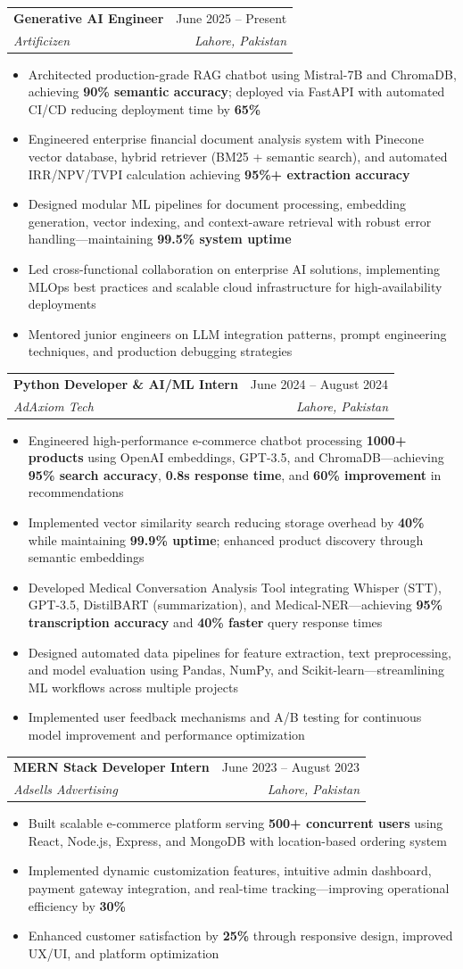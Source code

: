 \documentclass[letterpaper,10pt]{article}
\makeatletter
\newcommand{\resumeItem}[1]{\item\small{#1}}
\newcommand{\resumeSubheading}[4]{
  \vspace{-1pt}\item
    \begin{tabular*}{0.97\textwidth}[t]{l@{\extracolsep{\fill}}r}
      \textbf{#1} & #2 \\
      \textit{\small#3} & \textit{\small #4} \\
    \end{tabular*}\vspace{-5pt}
}
\newcommand{\resumeItemListStart}{\begin{itemize}[leftmargin=0.15in]}
\newcommand{\resumeItemListEnd}{\end{itemize}\vspace{-3pt}}
\makeatother
\begin{document}
\resumeSubheading
{Generative AI Engineer}{June 2025 -- Present}
{Artificizen}{Lahore, Pakistan}
\resumeItemListStart
\resumeItem{Architected production-grade RAG chatbot using Mistral-7B and ChromaDB, achieving \textbf{90\% semantic accuracy}; deployed via FastAPI with automated CI/CD reducing deployment time by \textbf{65\%}}
\resumeItem{Engineered enterprise financial document analysis system with Pinecone vector database, hybrid retriever (BM25 + semantic search), and automated IRR/NPV/TVPI calculation achieving \textbf{95\%+ extraction accuracy}}
\resumeItem{Designed modular ML pipelines for document processing, embedding generation, vector indexing, and context-aware retrieval with robust error handling—maintaining \textbf{99.5\% system uptime}}
\resumeItem{Led cross-functional collaboration on enterprise AI solutions, implementing MLOps best practices and scalable cloud infrastructure for high-availability deployments}
\resumeItem{Mentored junior engineers on LLM integration patterns, prompt engineering techniques, and production debugging strategies}
\resumeItemListEnd

\resumeSubheading
{Python Developer \& AI/ML Intern}{June 2024 -- August 2024}
{AdAxiom Tech}{Lahore, Pakistan}
\resumeItemListStart
\resumeItem{Engineered high-performance e-commerce chatbot processing \textbf{1000+ products} using OpenAI embeddings, GPT-3.5, and ChromaDB—achieving \textbf{95\% search accuracy}, \textbf{0.8s response time}, and \textbf{60\% improvement} in recommendations}
\resumeItem{Implemented vector similarity search reducing storage overhead by \textbf{40\%} while maintaining \textbf{99.9\% uptime}; enhanced product discovery through semantic embeddings}
\resumeItem{Developed Medical Conversation Analysis Tool integrating Whisper (STT), GPT-3.5, DistilBART (summarization), and Medical-NER—achieving \textbf{95\% transcription accuracy} and \textbf{40\% faster} query response times}
\resumeItem{Designed automated data pipelines for feature extraction, text preprocessing, and model evaluation using Pandas, NumPy, and Scikit-learn—streamlining ML workflows across multiple projects}
\resumeItem{Implemented user feedback mechanisms and A/B testing for continuous model improvement and performance optimization}
\resumeItemListEnd

\resumeSubheading
{MERN Stack Developer Intern}{June 2023 -- August 2023}
{Adsells Advertising}{Lahore, Pakistan}
\resumeItemListStart
\resumeItem{Built scalable e-commerce platform serving \textbf{500+ concurrent users} using React, Node.js, Express, and MongoDB with location-based ordering system}
\resumeItem{Implemented dynamic customization features, intuitive admin dashboard, payment gateway integration, and real-time tracking—improving operational efficiency by \textbf{30\%}}
\resumeItem{Enhanced customer satisfaction by \textbf{25\%} through responsive design, improved UX/UI, and platform optimization}
\resumeItemListEnd
\end{document}
